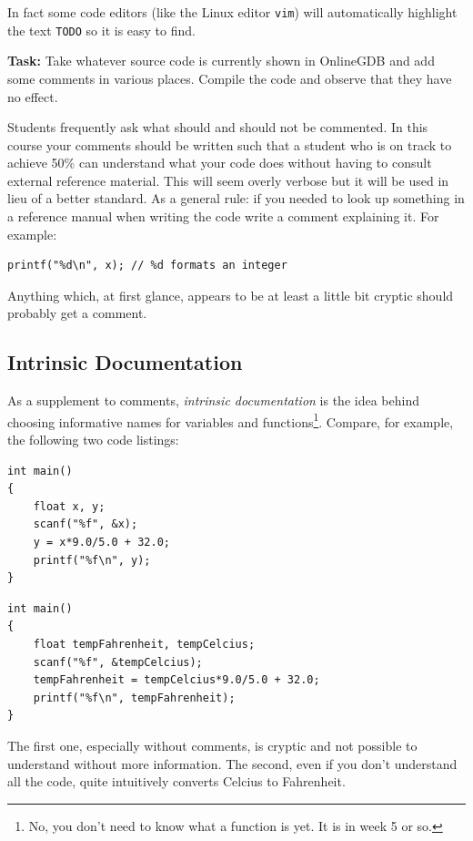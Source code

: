 \documentclass{lab}
\begin{document}
In fact some code editors (like the Linux editor \texttt{vim}) will automatically highlight the text \texttt{TODO} so it is easy to find.

\textbf{Task:} Take whatever source code is currently shown in OnlineGDB and add some comments in various places. Compile the code and observe that they have no effect.

Students frequently ask what should and should not be commented. In this course your comments should be written such that a student who is on track to achieve 50\% can understand what your code does without having to consult external reference material. This will seem overly verbose but it will be used in lieu of a better standard. As a general rule: if you needed to look up something in a reference manual when writing the code write a comment explaining it. For example:

\begin{lstlisting}[style=CStyle]
printf("%d\n", x); // %d formats an integer
\end{lstlisting}

Anything which, at first glance, appears to be at least a little bit cryptic should probably get a comment.

\pagebreak
\subsection{Intrinsic Documentation}

As a supplement to comments, \textit{intrinsic documentation} is the idea behind choosing informative names for variables and functions\footnote{No, you don't need to know what a function is yet. It is in week 5 or so.}. Compare, for example, the following two code listings:

\begin{lstlisting}[style=CStyle]
int main()
{
	float x, y;
	scanf("%f", &x);
	y = x*9.0/5.0 + 32.0;
	printf("%f\n", y);
}
\end{lstlisting}

\begin{lstlisting}[style=CStyle]
int main()
{
	float tempFahrenheit, tempCelcius;
	scanf("%f", &tempCelcius);
	tempFahrenheit = tempCelcius*9.0/5.0 + 32.0;
	printf("%f\n", tempFahrenheit);
}
\end{lstlisting}

The first one, especially without comments, is cryptic and not possible to understand without more information. The second, even if you don't understand all the code, quite intuitively converts Celcius to Fahrenheit.
\end{document}
